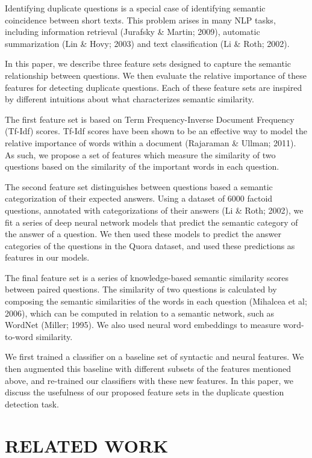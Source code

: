 \documentclass[letterpaper, 10 pt, conference]{ieeeconf}  %
\begin{document}
Identifying duplicate questions is a special case of identifying semantic coincidence between short texts. This problem arises in many NLP tasks, including information retrieval (Jurafsky \& Martin; 2009), automatic summarization (Lin \& Hovy; 2003) and text classification (Li \& Roth; 2002). 

In this paper, we describe three feature sets designed to capture the semantic relationship between questions. We then evaluate the relative importance of these features for detecting duplicate questions. Each of these feature sets are inspired by different intuitions about what characterizes semantic similarity.

The first feature set is based on Term Frequency-Inverse Document Frequency (Tf-Idf) scores. Tf-Idf scores have been shown to be an effective way to model the relative importance of words within a document (Rajaraman \& Ullman; 2011). As such, we propose a set of features which measure the similarity of two questions based on the similarity of the important words in each question.

The second feature set distinguishes between questions based a semantic categorization of their expected answers. Using a dataset of 6000 factoid questions, annotated with categorizations of their answers (Li \& Roth; 2002), we fit a series of deep neural network models that predict the semantic category of the answer of a question. We then used these models to predict the answer categories of the questions in the Quora dataset, and used these predictions as features in our models.

The final feature set is a series of knowledge-based semantic similarity scores between paired questions. The similarity of two questions is calculated by composing the semantic similarities of the words in each question (Mihalcea et al; 2006), which can be computed in relation to a semantic network, such as WordNet (Miller; 1995). We also used neural word embeddings to measure word-to-word similarity.

We first trained a classifier on a baseline set of syntactic and neural features. We then augmented this baseline with different subsets of the features mentioned above, and re-trained our classifiers with these new features. In this paper, we discuss the usefulness of our proposed feature sets in the duplicate question detection task.


\section{RELATED WORK}
\end{document}
